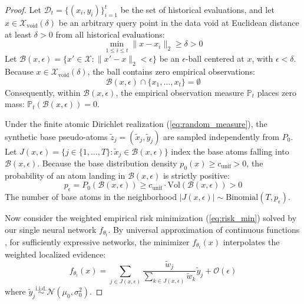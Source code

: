 \documentclass{article}
\begin{document}
\begin{proof}
Let $\mathcal{D}_t = \{(x_i, y_i)\}_{i=1}^t$ be the set of historical evaluations, and let $x \in \mathcal{X}_{\mathrm{void}}(\delta)$ be an arbitrary query point in the data void at Euclidean distance at least $\delta > 0$ from all historical evaluations:
\begin{equation}
\min_{1 \le i \le t} \|x - x_i\|_2 \ge \delta > 0
\end{equation}
Let $\mathcal{B}(x, \epsilon) = \{x' \in \mathcal{X} : \|x' - x\|_2 < \epsilon\}$ be an $\epsilon$-ball centered at $x$, with $\epsilon < \delta$. Because $x \in \mathcal{X}_{\mathrm{void}}(\delta)$, the ball contains zero empirical observations:
\begin{equation}
\mathcal{B}(x, \epsilon) \cap \{x_1, \dots, x_t\} = \emptyset
\end{equation}
Consequently, within $\mathcal{B}(x, \epsilon)$, the empirical observation measure $\mathbb{P}_t$ places zero mass: $\mathbb{P}_t(\mathcal{B}(x, \epsilon)) = 0$.

Under the finite atomic Dirichlet realization (\ref{eq:random_measure}), the synthetic base pseudo-atoms $\tilde{z}_j = (\tilde{x}_j, \tilde{y}_j)$ are sampled independently from $P_0$. Let $J(x, \epsilon) = \{j \in \{1, \dots, T\} : \tilde{x}_j \in \mathcal{B}(x, \epsilon)\}$ index the base atoms falling into $\mathcal{B}(x, \epsilon)$. Because the base distribution density $p_0(x) \ge c_{\mathrm{unif}} > 0$, the probability of an atom landing in $\mathcal{B}(x, \epsilon)$ is strictly positive:
\begin{equation}
p_\epsilon = P_0(\mathcal{B}(x, \epsilon)) \ge c_{\mathrm{unif}} \cdot \mathrm{Vol}(\mathcal{B}(x, \epsilon)) > 0
\end{equation}
The number of base atoms in the neighborhood $|J(x, \epsilon)| \sim \mathrm{Binomial}(T, p_\epsilon)$. 

Now consider the weighted empirical risk minimization (\ref{eq:risk_min}) solved by our single neural network $f_{\theta_t}$. By universal approximation of continuous functions \citep{hornik1989multilayer,pinkus1999approximation}, for sufficiently expressive networks, the minimizer $f_{\theta_t}(x)$ interpolates the weighted localized evidence:
\begin{equation}
f_{\theta_t}(x) = \sum_{j \in J(x, \epsilon)} \frac{\widetilde{w}_j}{\sum_{k \in J(x, \epsilon)} \widetilde{w}_k} \tilde{y}_j + \mathcal{O}(\epsilon)
\end{equation}
where $\tilde{y}_j \stackrel{\text{i.i.d.}}{\sim} \mathcal{N}(\mu_0, \sigma_0^2)$.


\end{proof}
\end{document}
